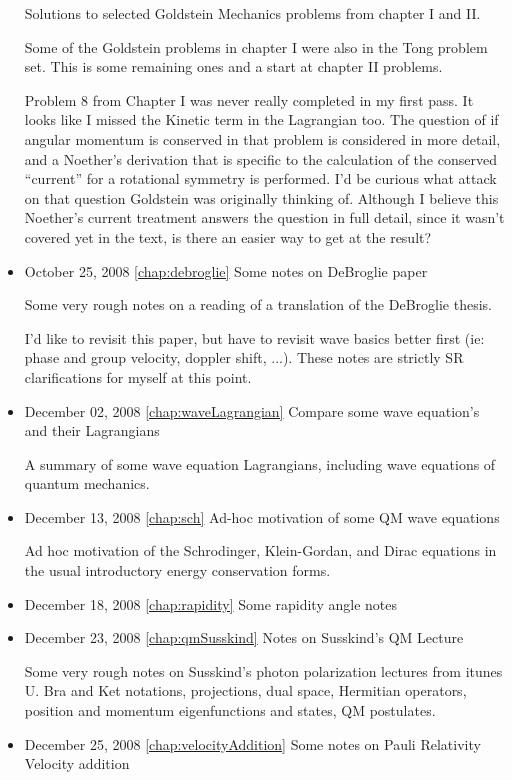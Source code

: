 \begin{itemize}
Solutions to selected Goldstein Mechanics problems from chapter I and II.

Some of the Goldstein problems in chapter I were also in the Tong problem set. This is some remaining ones and a start at chapter II problems.

Problem 8 from Chapter I was never really completed in my first pass.  It looks like I missed the Kinetic term in the Lagrangian too.  The question of if angular momentum is conserved in that problem is considered in more detail, and a Noether's derivation that is specific to the calculation of the conserved ``current'' for a rotational symmetry is performed.  I'd be curious what attack on that question Goldstein was originally thinking of.  Although I believe this Noether's current treatment answers the question in full detail, since it wasn't covered yet in the text, is there an easier way to get at the result?
\item October 25, 2008 \ref{chap:debroglie} Some notes on DeBroglie paper

Some very rough notes on a reading of a translation of the DeBroglie thesis.

I'd like to revisit this paper, but have to revisit wave basics better first (ie: phase and group velocity, doppler shift, ...).   These notes are strictly SR clarifications for myself at this point.\item December 02, 2008 \ref{chap:waveLagrangian} Compare some wave equation's and their Lagrangians

A summary of some wave equation Lagrangians, including wave equations of quantum mechanics.\item December 13, 2008 \ref{chap:sch} Ad-hoc motivation of some QM wave equations

Ad hoc motivation of the Schrodinger, Klein-Gordan, and Dirac equations in the usual introductory energy conservation forms.\item December 18, 2008 \ref{chap:rapidity} Some rapidity angle notes

\item December 23, 2008 \ref{chap:qmSusskind} Notes on Susskind's QM Lecture

Some very rough notes on Susskind's photon polarization lectures from itunes U.  Bra and Ket notations, projections, dual space, Hermitian operators, position and momentum eigenfunctions and states, QM postulates.\item December 25, 2008 \ref{chap:velocityAddition} Some notes on Pauli Relativity Velocity addition


\end{itemize}
